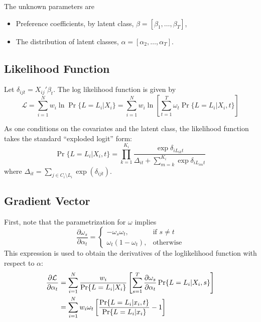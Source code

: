 \documentclass[12pt]{article}
\begin{document}
The unknown parameters are
\begin{itemize}
	\item Preference coefficients, by latent class, $\beta = [\beta_1,\dots, \beta_T]$,
	\item The distribution of latent classes, $\alpha = [\alpha_2,\dots,\alpha_T]$.
\end{itemize}

\subsection{Likelihood Function}
Let $\delta_{ijt} = X_{ij}'\beta_t$. The log likelihood function is given by
\begin{equation}
	\mathcal{L}
		= 	\sum_{i=1}^N w_i \ln\Pr\{L=L_i|X_i\} = \sum_{i=1}^N w_i \ln\left[\sum_{t=1}^T\omega_t\Pr\{L=L_i|X_i, t\}\right]\label{eq:logl}
\end{equation}

As one conditions on the covariates and the latent class, the likelihood function takes the standard ``exploded logit'' form:
\begin{equation}\label{eq:cond logl}
\Pr\{L=L_i|X_i, t\}
	=	\prod_{k=1}^{K_i}\frac{\exp{\delta_{iL_{ik}t}}}{\Delta_{it} + \sum_{m=k}^{K_i}\exp{\delta_{iL_{im}t}}}
\end{equation}
where $\Delta_{it} = \sum_{j\in{C_i\setminus{}L_i}}\exp(\delta_{ijt})$.



\subsection{Gradient Vector}
First, note that the parametrization for $\omega$ implies
\begin{equation*}
\frac{\partial\omega_s}{\partial\alpha_t} = \left\{
\begin{array}{ll}
-\omega_s\omega_t,      & \text{if $s\neq t$} \\
\omega_t(1 - \omega_t), & \text{otherwise}
\end{array}\right.
\end{equation*}
This expression is used to obtain the derivatives of the loglikelihood function with respect to $\alpha$:
\begin{align}
\frac{\partial\mathcal{L}}{\partial{\alpha_t}}
	&= 	\sum_{i=1}^N\frac{w_i}{\Pr\{L=L_i|X_i\}}
		\left[
			\sum_{s=1}^T\frac{\partial\omega_s}{\partial{\alpha_t}}\Pr\{L=L_i|X_i,s\}
		\right]\notag\\
	&=	\sum_{i=1}^N w_i\omega_t\left[\frac{\Pr\{L=L_i|x_i, t\}}{\Pr\{L=L_i|x_i\}}-1\right]\label{eq:dlogl alpha}
\end{align}
\end{document}
